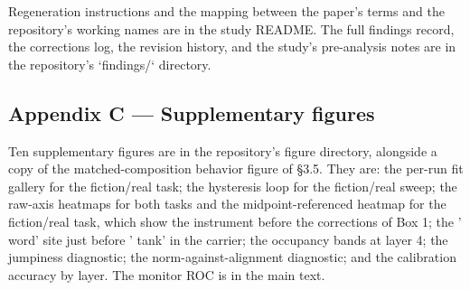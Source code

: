 \documentclass[11pt]{article}
\begin{document}
Regeneration instructions and the mapping between the paper's terms and the
repository's working names are in the study README. The full findings record, the
corrections log, the revision history, and the study's pre-analysis notes are in the
repository's `findings/` directory.

\subsection*{Appendix C — Supplementary figures}

Ten supplementary figures are in the repository's figure directory, alongside a
copy of the matched-composition behavior figure of \S3.5. They are: the per-run fit
gallery for the fiction/real task; the hysteresis loop for the fiction/real sweep;
the raw-axis heatmaps
for both tasks and the midpoint-referenced heatmap for the fiction/real task, which
show the instrument before the corrections of Box 1; the ' word' site just before ' tank' in the carrier;
the occupancy bands at layer 4; the jumpiness diagnostic; the norm-against-alignment
diagnostic; and the calibration accuracy by layer. The monitor ROC is in the main
text.



\end{document}
